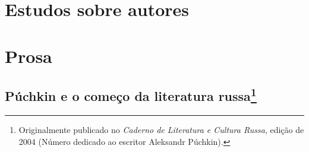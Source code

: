 















\part{Estudos sobre autores}

\part{Prosa}

\chapter{Púchkin e o começo da literatura russa\footnote{Originalmente publicado no \emph{Caderno de Literatura e Cultura Russa}, edição de 2004 (Número dedicado ao escritor Aleksandr Púchkin).}}

